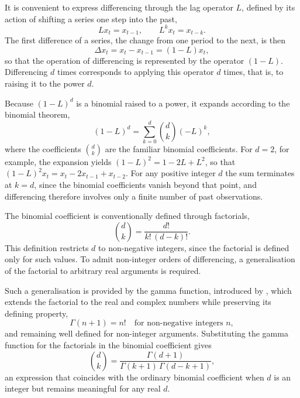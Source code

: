 \documentclass[12pt,a4paper]{article}
\begin{document}
It is convenient to express differencing through the lag operator $L$,
defined by its action of shifting a series one step into the past,
\begin{equation}
    L x_t = x_{t-1}, \qquad L^k x_t = x_{t-k}.
\end{equation}
The first difference of a series, the change from one period to the next,
is then
\begin{equation}
    \Delta x_t = x_t - x_{t-1} = (1 - L) x_t,
\end{equation}
so that the operation of differencing is represented by the operator
$(1 - L)$. Differencing $d$ times corresponds to applying this operator
$d$ times, that is, to raising it to the power $d$.

Because $(1-L)^d$ is a binomial raised to a power, it expands according to
the binomial theorem,
\begin{equation}
    (1 - L)^d = \sum_{k=0}^{d} \binom{d}{k} (-L)^k,
\end{equation}
where the coefficients $\binom{d}{k}$ are the familiar binomial
coefficients. For $d = 2$, for example, the expansion yields $(1-L)^2 = 1
- 2L + L^2$, so that $(1-L)^2 x_t = x_t - 2x_{t-1} + x_{t-2}$. For any
positive integer $d$ the sum terminates at $k = d$, since the binomial
coefficients vanish beyond that point, and differencing therefore
involves only a finite number of past observations.

The binomial coefficient is conventionally defined through factorials,
\begin{equation}
    \binom{d}{k} = \frac{d!}{k!\,(d-k)!}.
\end{equation}
This definition restricts $d$ to non-negative integers, since the
factorial is defined only for such values. To admit non-integer orders of
differencing, a generalisation of the factorial to arbitrary real
arguments is required.

Such a generalisation is provided by the gamma function, introduced by
\citet{Euler1738}, which extends the factorial to the real and complex
numbers while preserving its defining property,
\begin{equation}
    \Gamma(n + 1) = n! \quad \text{for non-negative integers } n,
\end{equation}
and remaining well defined for non-integer arguments. Substituting the
gamma function for the factorials in the binomial coefficient gives
\begin{equation}
    \binom{d}{k} = \frac{\Gamma(d + 1)}{\Gamma(k + 1)\,\Gamma(d - k + 1)},
\end{equation}
an expression that coincides with the ordinary binomial coefficient when
$d$ is an integer but remains meaningful for any real $d$.
\end{document}

